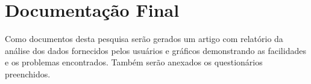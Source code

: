 \documentclass{article}
\begin{document}
\section{Documentação Final}

Como documentos desta pesquisa serão gerados um artigo com relatório da análise
dos dados fornecidos pelos usuários e gráficos demonstrando as facilidades e os
problemas encontrados. Também serão anexados os questionários preenchidos.
\end{document}
